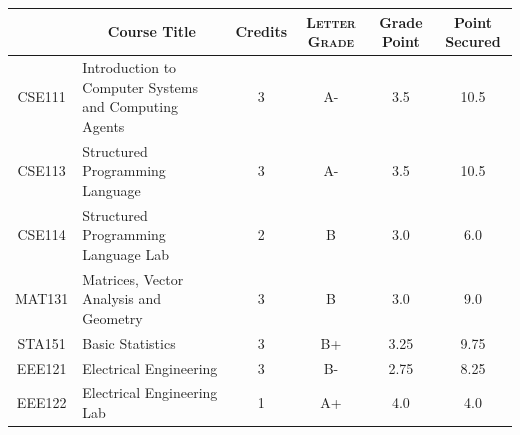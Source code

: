 \documentclass[11pt]{article}
\newcommand*{\numtwo}[1]{\pgfmathprintnumber[
                    fixed, precision=2, fixed zerofill=true]{#1}}
\begin{document}
                \begin{center}
                    \renewcommand{\arraystretch}{1.08}
                    
                \begin{tabular}{|c|l|c|>{\scshape}c|c|c|}
                \hline  \rule[-1ex]{0pt}{3.5ex} {\centering{\bf Course Code}} &  \multicolumn{1}{c|}{\textbf{Course Title}}  & {\bf Credits} & {\bf Letter Grade} & {\bf Grade Point} & {\bf Point Secured}  \\ 
                \hline   CSE111 &  Introduction to Computer Systems and Computing Agents		 & 3 & A- & 3.5 & 10.5 \\ %
                \hline   CSE113 &  Structured Programming Language		 & 3 & A- & 3.5 & 10.5 \\ %
                \hline   CSE114 &  Structured Programming Language Lab		 & 2 & B & 3.0 & 6.0 \\ %
                \hline   MAT131 &  Matrices, Vector Analysis and Geometry		 & 3 & B & 3.0 & 9.0 \\ %
                \hline   STA151 &  Basic Statistics		 & 3 & B+ & 3.25 & 9.75 \\ %
                \hline   EEE121 &  Electrical Engineering		 & 3 & B- & 2.75 & 8.25 \\ %
                \hline   EEE122 &  Electrical Engineering Lab		 & 1 & A+ & 4.0 & 4.0 \\ %

\hline                %
                \end{tabular}
                \end{center}
                \renewcommand{\arraystretch}{1.03}
\end{document}
